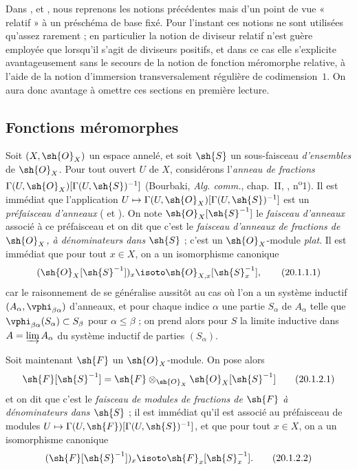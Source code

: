 Dans ,  et , nous reprenons les notions précédentes mais d'un point de vue « relatif » à un préschéma de base fixé.
Pour l'instant ces notions ne sont utilisées qu'assez rarement ; en particulier la notion de diviseur relatif n'est guère employée que lorsqu'il s'agit de diviseurs positifs, et dans ce cas elle s'explicite avantageusement sans le secours de la notion de fonction méromorphe relative, à l'aide de la notion d'immersion transversalement régulière de codimension~$1$.
On aura donc avantage à omettre ces sections en première lecture.

\subsection{Fonctions méromorphes}

\begin{env}[20.1.1]
Soit $(X,\sh{O}_X)$ un espace annelé, et soit $\sh{S}$ un sous-faisceau \emph{d'ensembles} de $\sh{O}_X$.
Pour tout ouvert $U$ de $X$, considérons l'\emph{anneau de fractions} $\Gamma(U,\sh{O}_X)[\Gamma(U,\sh{S})^{-1}]$ (Bourbaki, \emph{Alg. comm.}, chap.~II, , n\textsuperscript{o}1).
Il est immédiat que l'application $U\mapsto\Gamma(U,\sh{O}_X)[\Gamma(U,\sh{S})^{-1}]$ est un \emph{préfaisceau d'anneaux} ( et ).
On note $\sh{O}_X[\sh{S}^{-1}]$ le \emph{faisceau d'anneaux} associé à ce préfaisceau et on dit que c'est le \emph{faisceau d'anneaux de fractions de $\sh{O}_X$, à dénominateurs dans $\sh{S}$} ; c'est un $\sh{O}_X$-module \emph{plat}.
Il est immédiat que pour tout $x\in X$, on a un isomorphisme canonique
\[
\label{IV.20.1.1.1}
  (\sh{O}_X[\sh{S}^{-1}])_x\isoto\sh{O}_{X,x}[\sh{S}_x^{-1}],
  \tag{20.1.1.1}
\]
car le raisonnement de  se généralise aussitôt au cas où l'on a un système inductif $(A_\alpha,\vphi_{\beta\alpha})$ d'anneaux, et pour chaque indice $\alpha$ une partie $S_\alpha$ de $A_\alpha$ telle que
$\vphi_{\beta\alpha}(S_\alpha)\subset S_\beta$ pour $\alpha\leq\beta$ ; on prend alors pour $S$ la limite inductive dans $A=\varinjlim A_\alpha$ du système inductif de parties $(S_\alpha)$.
\end{env}

\begin{env}[20.1.2]
Soit maintenant $\sh{F}$ un $\sh{O}_X$-module.
On pose alors
\[
\label{IV.20.1.2.1}
  \sh{F}[\sh{S}^{-1}]=\sh{F}\otimes_{\sh{O}_X}\sh{O}_X[\sh{S}^{-1}]
  \tag{20.1.2.1}
\]
et on dit que c'est le \emph{faisceau de modules de fractions de $\sh{F}$ à dénominateurs dans $\sh{S}$} ; il est immédiat qu'il est associé au préfaisceau de modules $U\mapsto\Gamma(U,\sh{F})[\Gamma(U,\sh{S})^{-1}]$, et que pour tout $x\in X$, on a un isomorphisme canonique
\[
\label{IV.20.1.2.2}
  (\sh{F}[\sh{S}^{-1}])_x\isoto\sh{F}_x[\sh{S}_x^{-1}].
  \tag{20.1.2.2}
\]
\end{env}

